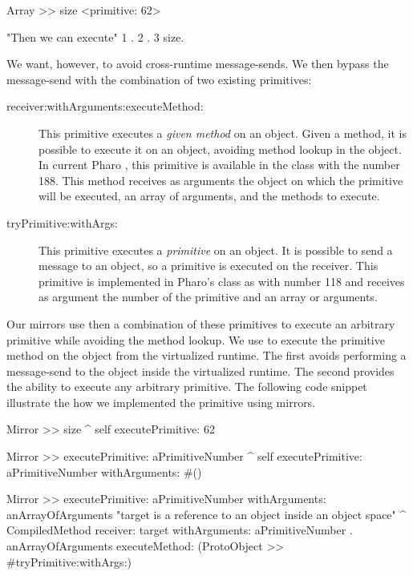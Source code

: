 \begin{code}
Array >> size
    <primitive: 62>

"Then we can execute"
{1 . 2 . 3} size.
\end{code}

We want, however, to avoid cross-runtime message-sends. We then bypass the message-send with the combination of two existing primitives:
\begin{description}

\item[receiver:withArguments:executeMethod:] This primitive executes a \emph{given method} on an object. Given a method, it is possible to execute it on an object, avoiding method lookup in the object. In current Pharo \VM, this primitive is available in the  class with the number 188. This method receives as arguments the object on which the primitive will be executed, an array of arguments, and the methods to execute.

\item[tryPrimitive:withArgs:] This primitive executes a \emph{primitive} on an object. It is possible to send a message to an object, so a primitive is executed on the receiver. This primitive is implemented in Pharo's  class as \textbf{} with number 118 and receives as argument the number of the primitive and an array or arguments.
\end{description}

Our mirrors use then a combination of these primitives to execute an arbitrary primitive while avoiding the method lookup. We use  to execute the primitive method  on the object from the virtualized runtime. The first avoids performing a message-send to the object inside the virtualized runtime. The second provides the ability to execute any arbitrary primitive. The following code snippet illustrate the how we implemented the  primitive using mirrors.

\begin{code}
Mirror >> size
    ^ self executePrimitive: 62

Mirror >> executePrimitive: aPrimitiveNumber 
    ^ self executePrimitive: aPrimitiveNumber withArguments: #()
    
Mirror >> executePrimitive: aPrimitiveNumber withArguments: anArrayOfArguments
    "target is a reference to an object inside an object space"
    ^ CompiledMethod
           receiver: target
           withArguments: { aPrimitiveNumber . anArrayOfArguments }
           executeMethod: (ProtoObject >> #tryPrimitive:withArgs:)
\end{code}

